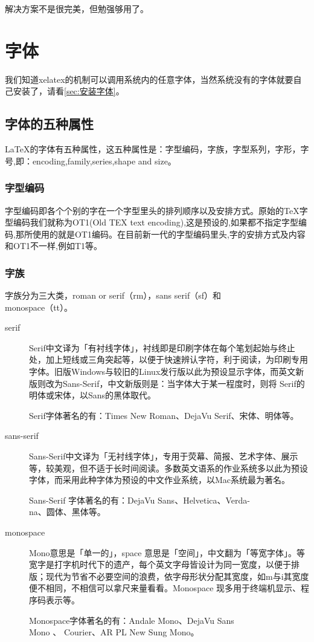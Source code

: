\documentclass[11pt,oneside]{book}
\begin{document}
解决方案不是很完美，但勉强够用了。





\chapter{字体}
我们知道xelatex的机制可以调用系统内的任意字体，当然系统没有的字体就要自己安装了，请看\ref{sec:安装字体}。

\section{字体的五种属性}
\LaTeX 的字体有五种属性，这五种属性是：字型编码，字族，字型系列，字形，字号,即：encoding,family,series,shape and size。

\subsection{字型编码}
字型编码即各个个别的字在一个字型里头的排列顺序以及安排方式。原始的\TeX 字型编码我们就称为OT1(Old TEX text encoding),这是预设的,如果都不指定字型编码,那所使用的就是OT1编码。在目前新一代的字型编码里头,字的安排方式及内容和OT1不一样,例如T1等。


\subsection{字族}
字族分为三大类，roman or serif（rm），sans serif（sf）和\\monospace（tt）。


\begin{description}
\item[serif] Serif中文译为「有衬线字体」，衬线即是印刷字体在每个笔划起始与终止处，加上短线或三角突起等，以便于快速辨认字符，利于阅读，为印刷专用字体。旧版Windows与较旧的Linux发行版以此为预设显示字体，而英文新版则改为Sans-Serif，中文新版则是：当字体大于某一程度时，则将 Serif的明体或宋体，以Sans的黑体取代。

Serif字体著名的有：Times New Roman、DejaVu Serif、宋体、明体等。

\item[sans-serif] Sans-Serif中文译为「无衬线字体」，专用于荧幕、简报、艺术字体、展示等，较美观，但不适于长时间阅读。多数英文语系的作业系统多以此为预设字体，而采用此种字体为预设的中文作业系统，以Mac系统最为著名。

Sans-Serif 字体著名的有：DejaVu Sans、Helvetica、Verda-\\na、圆体、黑体等。

\item[monospace] Mono意思是「单一的」，space 意思是「空间」，中文翻为「等宽字体」。等宽字是打字机时代下的遗产，每个英文字母皆设计为同一宽度，以便于排版；现代为节省不必要空间的浪费，依字母形状分配其宽度，如m与i其宽度便不相同，不相信可以拿尺来量看看。Monospace 现多用于终端机显示、程序码表示等。

Monospace字体著名的有：Andale Mono、DejaVu Sans \\ Mono 、 Courier、AR PL New Sung Mono。
\end{description}
\end{document}
